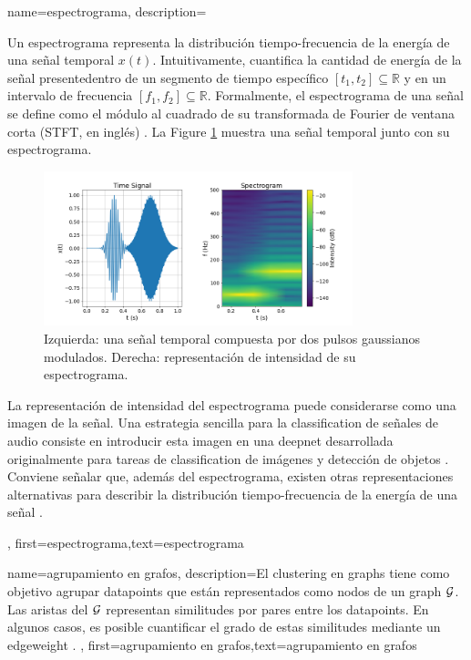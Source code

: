 {name={espectrograma},
	description={
		Un espectrograma representa la distribución tiempo-frecuencia de la energía de una señal temporal $x(t)$.  
		Intuitivamente, cuantifica la cantidad de energía de la señal presentedentro de un segmento de tiempo específico 
		$[t_{1},t_{2}] \subseteq \mathbb{R}$ y en un intervalo de frecuencia $[f_{1},f_{2}]\subseteq \mathbb{R}$. 
		Formalmente, el espectrograma de una señal se define como el módulo al cuadrado de su transformada
		de Fourier de ventana corta (STFT, en inglés) \cite{cohen1995time}.
        La Figure \ref{fig:spectrogram_dict} muestra una señal temporal junto con su espectrograma. 
	\begin{figure}[H]
		\centering
		\includegraphics[width=0.8\textwidth]{../../assets/spectrogram.png}
		\caption{Izquierda: una señal temporal compuesta por dos pulsos gaussianos modulados. Derecha: representación de intensidad de su espectrograma.
		\label{fig:spectrogram_dict}}
	\end{figure}
		La representación de intensidad del espectrograma puede considerarse como una imagen de la señal. 
		Una estrategia sencilla para la \gls{classification} de señales de audio consiste en introducir esta imagen en una 
		\gls{deepnet} desarrollada originalmente para tareas de \gls{classification} de imágenes y detección de objetos \cite{Li:2022aa}. 
		Conviene señalar que, además del espectrograma, existen otras representaciones alternativas para describir la distribución 
		tiempo-frecuencia de la energía de una señal \cite{TimeFrequencyAnalysisBoashash,MallatBook}. 
		}, 
	first={espectrograma},text={espectrograma} 
}

{name={agrupamiento en grafos},
	description={El \gls{clustering} en \gls{graph}s tiene como objetivo agrupar \gls{datapoint}s que están representados como nodos de un \gls{graph} $\mathcal{G}$.
		Las aristas del $\mathcal{G}$ representan similitudes por pares entre los \gls{datapoint}s. 
		En algunos casos, es posible cuantificar el grado de estas similitudes mediante un \gls{edgeweight} \cite{Luxburg2007,FlowSpecClustering2021}. 
		}, 
	first={agrupamiento en grafos},text={agrupamiento en grafos} 
}

